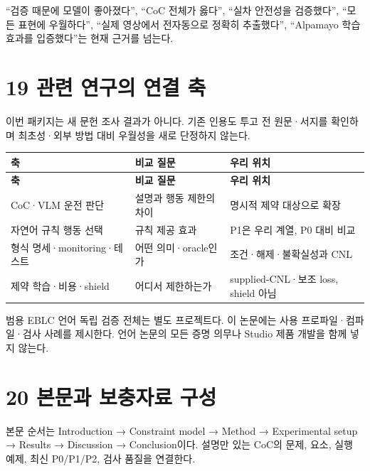 \documentclass[11pt,a4paper]{article}
\begin{document}
“검증 때문에 모델이 좋아졌다”, “CoC 전체가 옳다”, “실차 안전성을 검증했다”, “모든 표현에 우월하다”, “실제 영상에서 전자동으로 정확히 추출했다”, “Alpamayo 학습 효과를 입증했다”는 현재 근거를 넘는다.\par

\clearpage{}\section*{19 관련 연구의 연결 축}

이번 패키지는 새 문헌 조사 결과가 아니다. 기존 인용도 투고 전 원문·서지를 확인하며 최초성·외부 방법 대비 우월성을 새로 단정하지 않는다.\par

\begingroup\small
\begin{longtable}{@{}>{\raggedright\arraybackslash}p{}>{\raggedright\arraybackslash}p{}>{\raggedright\arraybackslash}p{}@{}}
\toprule
\textbf{축} & \textbf{비교 질문} & \textbf{우리 위치} \\
\midrule\endfirsthead
\toprule
\textbf{축} & \textbf{비교 질문} & \textbf{우리 위치} \\
\midrule\endhead
\bottomrule\endfoot
CoC·VLM 운전 판단 & 설명과 행동 제한의 차이 & 명시적 제약 대상으로 확장 \\
자연어 규칙 행동 선택 & 규칙 제공 효과 & P1은 우리 계열, P0 대비 비교 \\
형식 명세·monitoring·테스트 & 어떤 의미·oracle인가 & 조건·해제·불확실성과 CNL \\
제약 학습·비용·shield & 어디서 제한하는가 & supplied-CNL·보조 loss, shield 아님 \\
\end{longtable}
\endgroup

범용 EBLC 언어 독립 검증 전체는 별도 프로젝트다. 이 논문에는 사용 프로파일·컴파일·검사 사례를 제시한다. 언어 논문의 모든 증명 의무나 Studio 제품 개발을 함께 넣지 않는다.\par

\clearpage{}\section*{20 본문과 보충자료 구성}

본문 순서는 Introduction → Constraint model → Method → Experimental setup → Results → Discussion → Conclusion이다. 설명만 있는 CoC의 문제, 요소, 실행 예제, 최신 P0/P1/P2, 검사 품질을 연결한다.\par
\end{document}
